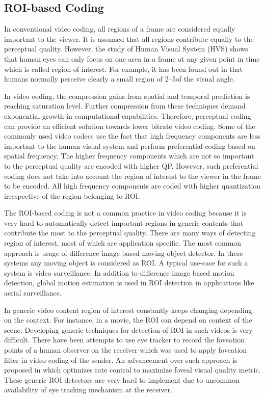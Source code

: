 \documentclass[11pt]{article} %
\begin{document}
\subsection{ROI-based Coding}

In conventional video coding, all regions of a frame are considered equally important to the viewer. It is assumed that all regions contribute equally to the perceptual quality. However, the study of Human Visual System (HVS) shows that human eyes can only focus on one area in a frame at any given point in time which is called region of interest. For example, it has been found out in \cite{human-vision-proof-NSI} that humans normally perceive clearly a small region of 2–5\degree of the visual angle.

In video coding, the compression gains from spatial and temporal prediction is reaching saturation level. Further compression from these techniques demand exponential growth in computational capabilities. Therefore, perceptual coding can provide an efficient solution towards lower bitrate video coding. Some of the commonly used video codecs use the fact that high frequency components are less important to the human visual system and perform preferential coding based on spatial frequency. The higher frequency components which are not so important to the perceptual quality are encoded with higher QP. However, such preferential coding does not take into account the region of interest to the viewer in the frame to be encoded. All high frequency components are coded with higher quantization irrespective of the region belonging to ROI. 

The ROI-based coding is not a common practice in video coding because it is very hard to automatically detect important regions in generic contents that contribute the most to the perceptual quality. There are many ways of detecting region of interest, most of which are application specific. The most common approach is usage of difference image based moving object detector. In these systems any moving object is considered as ROI. A typical use-case for such a system is video surveillance. In addition to difference image based motion detection, global motion estimation is used in ROI detection \cite{ROI-aerial-surveillance} in applications like aerial surveillance.

In generic video content region of interest constantly keeps changing depending on the context. For instance, in a movie, the ROI can depend on context of the scene. Developing generic techniques for detection of ROI in such videos is very difficult. There have been attempts to use eye tracker to record the foveation points of a human observer on the receiver which was used to apply foveation filter in video coding of the sender. An advancement over such approach is proposed in \cite{foveated-rate-control} which optimizes rate control to maximize foveal visual quality metric. These generic ROI detectors are very hard to implement due to uncommon availability of eye tracking mechanism at the receiver. 
\end{document}
